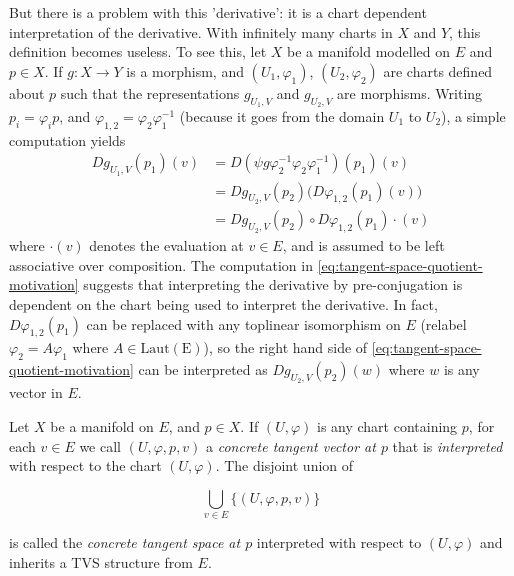 \documentclass[../main-manifolds.tex]{subfiles}
\begin{document}
But there is a problem with this 'derivative': it is a chart dependent interpretation of the derivative. With infinitely many charts in $X$ and $Y$, this definition becomes useless. To see this, let $X$ be a manifold modelled on $E$ and $p\in X$. If $g: X\to Y$ is a morphism, and $(U_1,\varphi_1)$, $(U_2,\varphi_2)$ are charts defined about $p$ such that the representations $g_{U_1, V}$ and $g_{U_2, V}$ are morphisms. Writing $p_i = \varphi_i p$, and $\varphi_{1,2}=\varphi_2\varphi_{1}^{-1}$ (because it goes from the domain $U_1$ to $U_2$), a simple computation yields
\begin{align}
    Dg_{U_1, V}(p_1)(v) &= D(\psi g \varphi_2^{-1}\varphi_2\varphi_1^{-1})(p_1)(v) \nonumber\\
    &= Dg_{U_2,V}(p_2)\biggl(D\varphi_{1,2}(p_1)(v)\biggr)\nonumber\\
    &= Dg_{U_2,V}(p_2)\circ D\varphi_{1,2}(p_1)\cdot (v)\label{eq:tangent-space-quotient-motivation}
\end{align}
where $\cdot(v)$ denotes the evaluation at $v\in E$, and is assumed to be left associative over composition. The computation in \cref{eq:tangent-space-quotient-motivation} suggests that interpreting the derivative by pre-conjugation is dependent on the chart being used to interpret the derivative. In fact, $D\varphi_{1,2}(p_1)$ can be replaced with any toplinear isomorphism on $E$ (relabel $\varphi_2 = A\varphi_1$ where $A\in\operatorname{Laut(E)}$), so the right hand side of \cref{eq:tangent-space-quotient-motivation} can be interpreted as $Dg_{U_2,V}(p_2)(w)$ where $w$ is any vector in $E$. 

\begin{definition}
    Let $X$ be a manifold on $E$, and $p\in X$. If $(U,\varphi)$ is any chart containing $p$, for each $v\in E$ we call $(U,\varphi,p,v)$ a \emph{concrete tangent vector at $p$} that is \emph{interpreted} with respect to the chart $(U,\varphi)$. The disjoint union of

    \begin{equation}\label{eq:concrete-tangent-space-eq}
        \bigcup_{v\in E}\{(U,\varphi,p,v)\}
    \end{equation}

    is called the \emph{concrete tangent space at $p$} interpreted with respect to $(U,\varphi)$ and inherits a TVS structure from $E$.
\end{definition}
\end{document}
